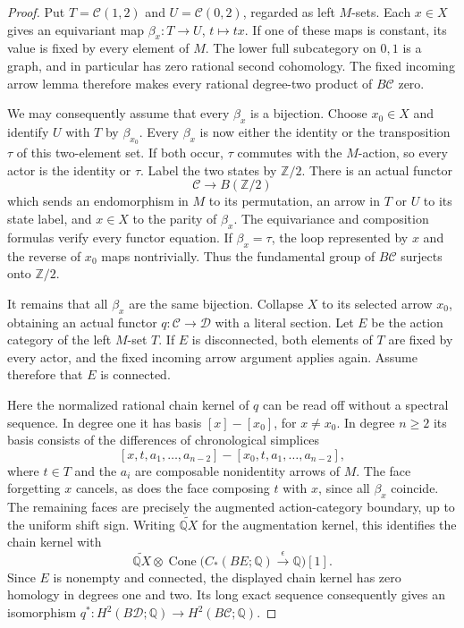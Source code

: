 \begin{proof}
Put $T=\mathcal C(1,2)$ and $U=\mathcal C(0,2)$, regarded as left
$M$-sets.  Each $x\in X$ gives an equivariant map
$\beta_x:T\longrightarrow U$, $t\longmapsto tx$.
If one of these maps is constant, its value is fixed by every element
of $M$.  The lower full subcategory on $0,1$ is a graph, and in
particular has zero rational second cohomology.  The fixed incoming
arrow lemma therefore makes every rational degree-two product of
$B\mathcal C$ zero.

We may consequently assume that every $\beta_x$ is a bijection.
Choose $x_0\in X$ and identify $U$ with $T$ by $\beta_{x_0}$.
Every $\beta_x$ is now either the identity or the transposition
$\tau$ of this two-element set.  If both occur, $\tau$ commutes with
the $M$-action, so every actor is the identity or $\tau$.
Label the two states by $\mathbb Z/2$.  There is an actual functor
\[
 \mathcal C\longrightarrow B(\mathbb Z/2)
\]
which sends an endomorphism in $M$ to its permutation, an arrow in
$T$ or $U$ to its state label, and $x\in X$ to the parity of
$\beta_x$.  The equivariance and composition formulas verify every
functor equation.  If $\beta_x=\tau$, the loop represented by $x$
and the reverse of $x_0$ maps nontrivially.  Thus the fundamental
group of $B\mathcal C$ surjects onto $\mathbb Z/2$.

It remains that all $\beta_x$ are the same bijection.  Collapse $X$
to its selected arrow $x_0$, obtaining an actual functor
$q:\mathcal C\longrightarrow\mathcal D$ with a literal section.
Let $E$ be the action category of the left $M$-set $T$.
If $E$ is disconnected, both elements of $T$ are fixed by every
actor, and the fixed incoming arrow argument applies again.
Assume therefore that $E$ is connected.

Here the normalized rational chain kernel of $q$ can be read off
without a spectral sequence.  In degree one it has basis
$[x]-[x_0]$, for $x\ne x_0$.  In degree $n\ge2$ its basis consists
of the differences of chronological simplices
\[
 [x,t,a_1,\ldots,a_{n-2}]
 -[x_0,t,a_1,\ldots,a_{n-2}],
\]
where $t\in T$ and the $a_i$ are composable nonidentity arrows of
$M$.  The face forgetting $x$ cancels, as does the face composing
$t$ with $x$, since all $\beta_x$ coincide.  The remaining faces
are precisely the augmented action-category boundary, up to the
uniform shift sign.  Writing $\widetilde{\mathbb Q X}$ for the
augmentation kernel, this identifies the chain kernel with
\[
 \widetilde{\mathbb Q X}\otimes
 \operatorname{Cone}\bigl(C_*(BE;\mathbb Q)
                    \xrightarrow{\epsilon}\mathbb Q\bigr)[1].
\]
Since $E$ is nonempty and connected, the displayed chain kernel
has zero homology in degrees one and two.  Its long exact sequence consequently gives
an isomorphism
$q^*:H^2(B\mathcal D;\mathbb Q)\longrightarrow
H^2(B\mathcal C;\mathbb Q)$.


\end{proof}
